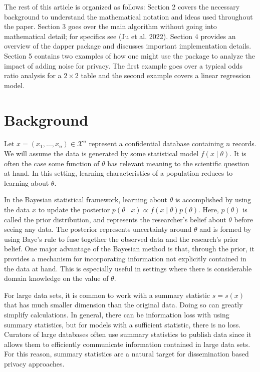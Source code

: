 The rest of this article is organized as follows:
Section 2 covers the necessary background to understand the mathematical notation
and ideas used throughout the paper. Section 3 goes over the main algorithm without
going into mathematical detail; for specifics see (Ju et al. 2022). Section 4 provides
an overview of the dapper package and discusses important implementation details.
Section 5 contains two examples of how one might use the package to analyze the
impact of adding noise for privacy. The first example goes over a typical
odds ratio analysis for a \(2 \times 2\) table and the second example
covers a linear regression model.

\hypertarget{background}{%
\section{Background}\label{background}}

Let \(x = (x_1, \ldots, x_n) \in \mathcal{X}^n\) represent a confidential
database containing \(n\) records. We will assume the
data is generated by some statistical model \(f( x \mid \theta)\). It is often the case
some function of \(\theta\) has relevant meaning to the scientific question at hand. In this setting,
learning characteristics of a population reduces to learning about \(\theta\).

In the Bayesian statistical framework, learning about \(\theta\) is
accomplished by using the data \(x\) to update the
posterior \(p(\theta \mid x) \propto f(x \mid \theta) p(\theta)\).
Here, \(p(\theta)\) is called the prior distribution, and represents
the researcher's belief about \(\theta\) before seeing any data. The
posterior represents uncertainty around \(\theta\) and is formed by using Baye's rule to fuse together the
observed data and the research's prior belief.
One major advantage of the Bayesian method is that, through the prior,
it provides a mechanism for incorporating information not explicitly contained
in the data at hand. This is especially useful in settings where there
is considerable domain knowledge on the value of \(\theta\).

For large data sets, it is common to work with a summary statistic \(s = s(x)\)
that has much smaller dimension than the original data. Doing so can
greatly simplify calculations. In general, there can be information
loss with using summary statistics, but for models with a sufficient
statistic, there is no loss. Curators of large databases
often use summary statistics to publish data since it allows them
to efficiently communicate information contained in large data sets.
For this reason, summary statistics are a natural target for
dissemination based privacy approaches.

